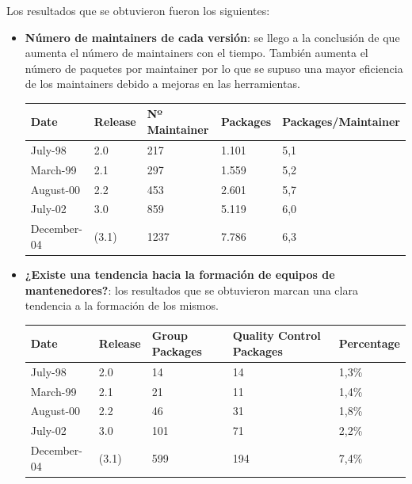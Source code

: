 \documentclass[a4paper, 12pt]{book}
\begin{document}
Los resultados que se obtuvieron fueron los siguientes:
\begin{itemize}
	\item \textbf {Número de maintainers de cada versión}: se llego a la conclusión de que aumenta el número de maintainers con el tiempo. También aumenta el número de paquetes por maintainer por lo que se supuso una mayor eficiencia de los maintainers debido a mejoras en las herramientas.
	
	\begin{table}[]
		\begin{tabular}{|l|l|l|l|l|}
			\hline
			Date        & Release & Nº Maintainer & Packages & Packages/Maintainer \\ \hline
			July-98     & 2.0     & 217           & 1.101    & 5,1                 \\ \hline
			March-99    & 2.1     & 297           & 1.559    & 5,2                 \\ \hline
			August-00   & 2.2     & 453           & 2.601    & 5,7                 \\ \hline
			July-02     & 3.0     & 859           & 5.119    & 6,0                 \\ \hline
			December-04 & (3.1)   & 1237          & 7.786    & 6,3                 \\ \hline
		\end{tabular}
	\end{table}
	
	\item \textbf {¿Existe una tendencia hacia la formación de equipos de 
	mantenedores?}: los resultados que se obtuvieron marcan una clara tendencia a la formación de los mismos.
	
	\begin{table}[h]
		\begin{tabular}{|l|l|l|l|l|}
			\hline
			Date        & Release & Group Packages & Quality Control Packages & Percentage \\ \hline
			July-98     & 2.0     & 14             & 14                       & 1,3\%      \\ \hline
			March-99    & 2.1     & 21             & 11                       & 1,4\%      \\ \hline
			August-00   & 2.2     & 46             & 31                       & 1,8\%      \\ \hline
			July-02     & 3.0     & 101            & 71                       & 2,2\%      \\ \hline
			December-04 & (3.1)   & 599            & 194                      & 7,4\%      \\ \hline
		\end{tabular}
	\end{table}
	

\end{itemize}
\end{document}
